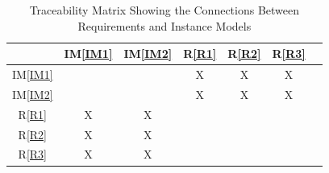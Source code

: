 \documentclass[12pt]{article}
\newcommand{\iref}[1]{IM\ref{#1}}
\newcommand{\rref}[1]{R\ref{#1}}
\begin{document}
\begin{table}[h!]
\centering
\begin{tabular}{|c|c|c|c|c|c|c|}
\hline
           & \iref{IM1} & \iref{IM2} & \rref{R1} & \rref{R2} & \rref{R3}   \\
\hline
\iref{IM1} &            &            &    X      &    X      &    X        \\ \hline
\iref{IM2} &            &            &    X      &    X      &    X        \\ \hline
\rref{R1}  &      X     &     X      &           &           &             \\ \hline
\rref{R2}  &      X     &     X      &           &           &             \\ \hline
\rref{R3}  &      X     &     X      &           &           &             \\ \hline
\end{tabular}
\caption{Traceability Matrix Showing the Connections Between Requirements and Instance Models}
\label{Table:R_trace}
\end{table}




\end{document}
